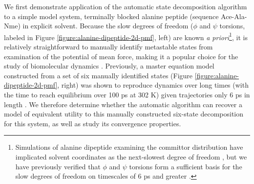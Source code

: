 We first demonstrate application of the automatic state decomposition algorithm to a simple model system, terminally blocked alanine peptide (sequence Ace-Ala-Nme) in explicit solvent.
Because the slow degrees of freedom ($\phi$ and $\psi$ torsions, labeled in Figure \ref{figure:alanine-dipeptide-2d-pmf}, left) are known \emph{a priori}\footnote{Simulations of alanine dipeptide examining the committor distribution have implicated solvent coordinates as the next-slowest degree of freedom \cite{bolhuis:2000a,ma:2005a}, but we have previously verified that $\phi$ and $\psi$ torsions form a sufficient basis for the slow degrees of freedom on timescales of 6 ps and greater \cite{chodera:mms:2006}.}, it is relatively straightforward to manually identify metastable states from examination of the potential of mean force, making it a popular choice for the study of biomolecular dynamics \cite{apostolakis:1999a,bolhuis:2000a,mortenson:2001a,hummer:2003a,chekmarev:2004a,chodera:mms:2006}.
Previously, a master equation model constructed from a set of six manually identified states (Figure \ref{figure:alanine-dipeptide-2d-pmf}, right) was shown to reproduce dynamics over long times (with the time to reach equilibrium over 100 ps at 302 K) given trajectories only 6 ps in length \cite{chodera:mms:2006}.
We therefore determine whether the automatic algorithm can recover a model of equivalent utility to this manually constructed six-state decomposition for this system, as well as study its convergence properties.

